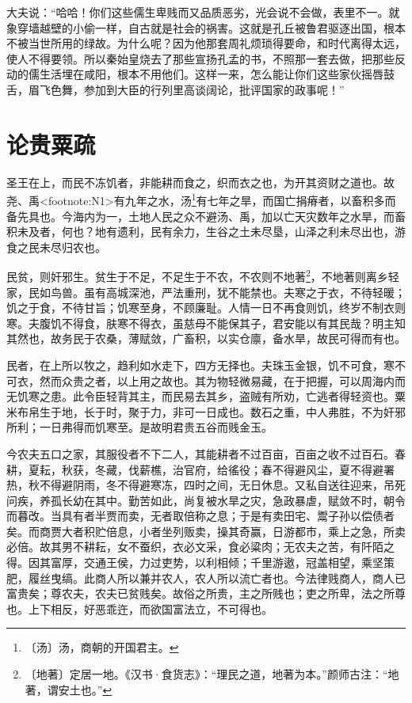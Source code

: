 \documentclass[12pt,UTF-8,openany]{ctexbook}
\begin{document}
\begin{normalsize}
    大夫说：“哈哈！你们这些儒生卑贱而又品质恶劣，光会说不会做，表里不一。就象穿墙越壁的小偷一样，自古就是社会的祸害。这就是孔丘被鲁君驱逐出国，根本不被当世所用的绿故。为什么呢？因为他那套周礼烦琐得要命，和时代离得太远，使人不得要领。所以秦始皇烧去了那些宣扬孔孟的书，不照那一套去做，把那些反动的儒生活埋在咸阳，根本不用他们。这样一来，怎么能让你们这些家伙摇唇鼓舌，眉飞色舞，参加到大臣的行列里高谈阔论，批评国家的政事呢！”
    
\end{normalsize}



\chapter{论贵粟疏}

\begin{normalsize}
    
    圣王在上，而民不冻饥者，非能耕而食之，织而衣之也，为开其资财之道也。故尧、禹<footnote:N1>有九年之水，汤\footnote{〔汤〕汤，商朝的开国君主。}有七年之旱，而国亡捐瘠者，以畜积多而备先具也。今海内为一，土地人民之众不避汤、禹，加以亡天灾数年之水旱，而畜积未及者，何也？地有遗利，民有余力，生谷之土未尽垦，山泽之利未尽出也，游食之民未尽归农也。
    
    民贫，则奸邪生。贫生于不足，不足生于不农，不农则不地著\footnote{〔地著〕定居一地。《汉书·食货志》：“理民之道，地著为本。”颜师古注：“地著，谓安土也。”}，不地著则离乡轻家，民如鸟兽。虽有高城深池，严法重刑，犹不能禁也。夫寒之于衣，不待轻暖；饥之于食，不待甘旨；饥寒至身，不顾廉耻。人情一日不再食则饥，终岁不制衣则寒。夫腹饥不得食，肤寒不得衣，虽慈母不能保其子，君安能以有其民哉？明主知其然也，故务民于农桑，薄赋敛，广畜积，以实仓廪，备水旱，故民可得而有也。
    
    民者，在上所以牧之，趋利如水走下，四方无择也。夫珠玉金银，饥不可食，寒不可衣，然而众贵之者，以上用之故也。其为物轻微易藏，在于把握，可以周海内而无饥寒之患。此令臣轻背其主，而民易去其乡，盗贼有所劝，亡逃者得轻资也。粟米布帛生于地，长于时，聚于力，非可一日成也。数石之重，中人弗胜，不为奸邪所利；一日弗得而饥寒至。是故明君贵五谷而贱金玉。
    
    今农夫五口之家，其服役者不下二人，其能耕者不过百亩，百亩之收不过百石。春耕，夏耘，秋获，冬藏，伐薪樵，治官府，给徭役；春不得避风尘，夏不得避署热，秋不得避阴雨，冬不得避寒冻，四时之间，无日休息。又私自送往迎来，吊死问疾，养孤长幼在其中。勤苦如此，尚复被水旱之灾，急政暴虐，赋敛不时，朝令而暮改。当具有者半贾而卖，无者取倍称之息；于是有卖田宅、鬻子孙以偿债者矣。而商贾大者积贮倍息，小者坐列贩卖，操其奇赢，日游都市，乘上之急，所卖必倍。故其男不耕耘，女不蚕织，衣必文采，食必粱肉；无农夫之苦，有阡陌之得。因其富厚，交通王侯，力过吏势，以利相倾；千里游遨，冠盖相望，乘坚策肥，履丝曳缟。此商人所以兼并农人，农人所以流亡者也。今法律贱商人，商人已富贵矣；尊农夫，农夫已贫贱矣。故俗之所贵，主之所贱也；吏之所卑，法之所尊也。上下相反，好恶乖迕，而欲国富法立，不可得也。
    

\end{normalsize}
\end{document}

